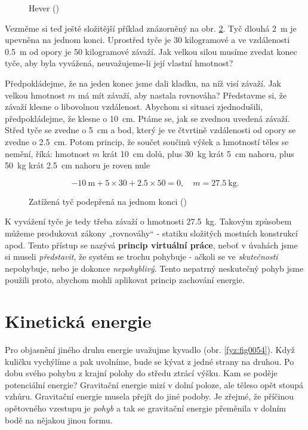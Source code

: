     \begin{figure}[ht!]  %
      \centering
      \caption{Hever (\cite[s.~55]{Feynman01})}
      \label{fyz:fig0052}
    \end{figure}

    Vezměme si teď ještě složitější příklad znázorněný na obr. \ref{fyz:fig0053}. Tyč dlouhá 
    \SI{2}{\m} je upevněna na jednom konci. Uprostřed tyče je \num{30} kilogramové a ve vzdálenosti 
    \SI{0.5}{\m} od opory je \num{50} kilogramové závaží. Jak velkou silou musíme zvedat konec 
    tyče, aby byla vyvážená, neuvažujeme-li její vlastní hmotnost?
      
    Předpokládejme, že na jeden konec jsme dali kladku, na níž visí závaží. Jak velkou hmotnost 
    \(m\) má mít závaží, aby nastala rovnováha? Představme si, že závaží klesne o libovolnou 
    vzdálenost. Abychom si situaci zjednodušili, předpokládejme, že klesne o \SI{10}{cm}. Ptáme se, 
    jak se zvednou uvedená závaží. Střed tyče se zvedne o \SI{5}{\cm} a bod, který je ve čtvrtině 
    vzdálenosti od opory se zvedne o \SI{2.5}{\cm}. Potom princip, že součet součinů výšek a 
    hmotností těles se nemění, říká: hmotnost \(m\) krát \SI{10}{\cm} dolů, plus \SI{30}{\kg} krát 
    \SI{5}{\cm} nahoru, plus \SI{50}{\kg} krát \SI{2.5}{\cm} nahoru je roven nule
    
    \begin{equation*}
       -\SI{10}{\m} + \num{5}\times\num{30} + \num{2.5}\times\num{50} = \num{0}, 
       \quad m = \SI{27.5}{\kg}.
    \end{equation*}
    \begin{figure}[ht!]  %
      \centering
      \caption{Zatížená tyč podepřená na jednom konci (\cite[s.~56]{Feynman01})}
      \label{fyz:fig0053}
    \end{figure}
    K vyvážení tyče je tedy třeba závaží o hmotnosti \SI{27.5}{\kg}. Takovým způsobem můžeme 
    produkovat zákony „rovnováhy“ - statiku složitých mostních konstrukcí apod. Tento přístup se 
    nazývá \textbf{princip virtuální práce}, neboť v úvahách jsme si museli \emph{představit}, že 
    systém se trochu pohybuje - ačkoli se ve \emph{skutečnosti} nepohybuje, nebo je dokonce 
    \emph{nepohyblivý}. Tento nepatrný neskutečný pohyb jsme použili proto, abychom mohli aplikovat 
    princip zachování energie.

  \section{Kinetická energie}
    Pro objasnění jiného druhu energie uvažujme kyvadlo (obr. \ref{fyz:fig0054}). Když kuličku 
    vychýlíme a pak uvolníme, bude se kývat z jedné strany na druhou. Po dobu svého pohybu z krajní 
    polohy do středu ztrácí výšku. Kam se poděje potenciální energie? Gravitační energie mizí v 
    dolní poloze, ale těleso opět stoupá vzhůru. Gravitační energie musela přejít do jiné podoby. 
    Je zřejmé, že příčinou opětovného vzestupu je \emph{pohyb} a tak se gravitační energie 
    přeměnila v dolním bodě na nějakou jinou formu.
    
